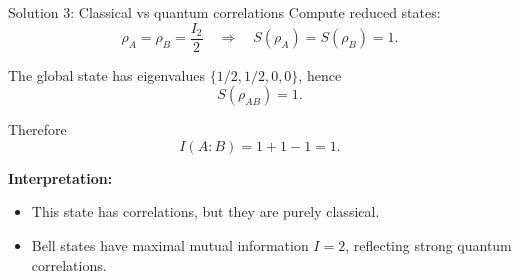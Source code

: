 \documentclass[aspectratio=169]{beamer}
\begin{document}
\begin{frame}{Solution 3: Classical vs quantum correlations}
Compute reduced states:
\[
\rho_A=\rho_B=\frac{I_2}{2}\quad\Rightarrow\quad S(\rho_A)=S(\rho_B)=1.
\]

The global state has eigenvalues $\{1/2,1/2,0,0\}$, hence
\[
S(\rho_{AB})=1.
\]

Therefore
\[
I(A\!:\!B)=1+1-1=1.
\]

\medskip
\textbf{Interpretation:}
\begin{itemize}
\item This state has correlations, but they are purely classical.
\item Bell states have maximal mutual information $I=2$, reflecting strong quantum correlations.
\end{itemize}
\end{frame}
\end{document}
